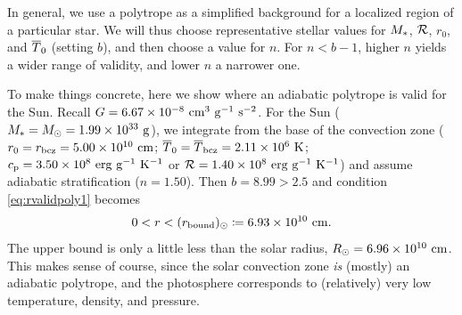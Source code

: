 \documentclass[12pt]{article}
\numberwithin{equation}{section}
\newcommand{\rbound}{r_{\rm{bound}}}
\begin{document}
In general, we use a polytrope as a simplified background for a localized region of a particular star. We will thus choose representative stellar values for $M_*$, $\mathcal{R}$, $r_0$, and $\overline{T}_0$ (setting $b$), and then choose a value for $n$. For $n<b-1$, higher $n$ yields a wider range of validity, and lower $n$ a narrower one. 

To make things concrete, here we show where an adiabatic polytrope is valid for the Sun. Recall $G=\sn{6.67}{-8}\ \cm^3\ \gram^{-1}\ \second^{-2}$. For the Sun ($M_*=M_\odot=1.99\times10^{33}\ {\rm{g}}$), we integrate from the base of the convection zone ($r_0=r_{\rm{bcz}}=5.00\times10^{10}\ {\rm{cm}}$; $\overline{T}_0=\overline{T}_{\rm{bcz}}=2.11\times10^{6}\ {\rm{K}}$; $c_{\rm{p}}=3.50\times10^{8}\ {\rm{erg\ g^{-1}\ K^{-1}}}$ or $\mathcal{R}=1.40\times10^{8}\ {\rm{erg\ g^{-1}\ K^{-1}}}$) and assume adiabatic stratification ($n=1.50$). Then $b=8.99 > 2.5$ and condition \eqref{eq:rvalidpoly1} becomes
\begin{align*}
	0<r<(\rbound)_\odot\define\sn{6.93}{10}\ \cm. 
\end{align*}
The upper bound is only a little less than the solar radius, $\rsun=\sn{6.96}{10}\ \cm$. This makes sense of course, since the solar convection zone \textit{is} (mostly) an adiabatic polytrope, and the photosphere corresponds to (relatively) very low temperature, density, and pressure. 
\end{document}
